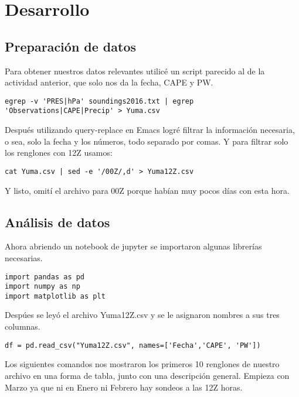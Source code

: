 \documentclass[12pt,a4paper]{article}
\begin{document}
\newpage

\section{Desarrollo}

\subsection{Preparación de datos}

Para obtener nuestros datos relevantes utilicé un script parecido al de la actividad anterior, que solo nos da la fecha, CAPE y PW.

\begin{verbatim}
egrep -v 'PRES|hPa' soundings2016.txt | egrep 'Observations|CAPE|Precip' > Yuma.csv
\end{verbatim}

Después utilizando query-replace en Emacs logré filtrar la información necesaria, o sea, solo la fecha y los números, todo separado por comas. Y para filtrar solo los renglones con 12Z usamos:

\begin{verbatim}
cat Yuma.csv | sed -e '/00Z/,d' > Yuma12Z.csv
\end{verbatim}

Y listo, omití el archivo para 00Z porque habían muy pocos días con esta hora.

\subsection{Análisis de datos}

Ahora abriendo un notebook de jupyter se importaron algunas librerías necesarias.

\begin{verbatim}
import pandas as pd
import numpy as np
import matplotlib as plt
\end{verbatim}

Despúes se leyó el archivo Yuma12Z.csv y se le asignaron nombres a sus tres columnas.
\begin{verbatim}
df = pd.read_csv("Yuma12Z.csv", names=['Fecha','CAPE', 'PW'])
\end{verbatim}

Los siguientes comandos nos mostraron los primeros 10 renglones de nuestro archivo en una forma de tabla, junto con una descripción general. Empieza con Marzo ya que ni en Enero ni Febrero hay sondeos a las 12Z horas.
\end{document}
